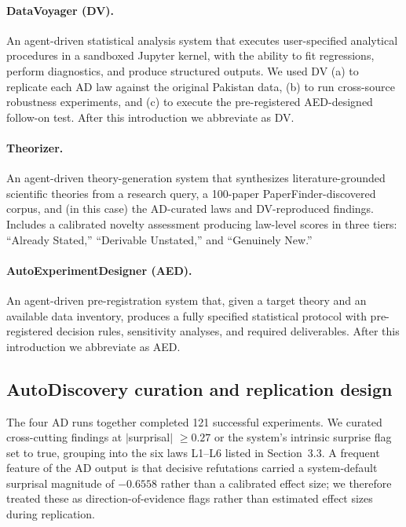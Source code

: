 \documentclass[11pt]{article}
\begin{document}
\paragraph{DataVoyager (DV).} An agent-driven statistical analysis system that executes user-specified analytical procedures in a sandboxed Jupyter kernel, with the ability to fit regressions, perform diagnostics, and produce structured outputs. We used DV (a) to replicate each AD law against the original Pakistan data, (b) to run cross-source robustness experiments, and (c) to execute the pre-registered AED-designed follow-on test. After this introduction we abbreviate as DV.

\paragraph{Theorizer.} An agent-driven theory-generation system that synthesizes literature-grounded scientific theories from a research query, a 100-paper PaperFinder-discovered corpus, and (in this case) the AD-curated laws and DV-reproduced findings. Includes a calibrated novelty assessment producing law-level scores in three tiers: ``Already Stated,'' ``Derivable Unstated,'' and ``Genuinely New.''

\paragraph{AutoExperimentDesigner (AED).} An agent-driven pre-registration system that, given a target theory and an available data inventory, produces a fully specified statistical protocol with pre-registered decision rules, sensitivity analyses, and required deliverables. After this introduction we abbreviate as AED.

\subsection{AutoDiscovery curation and replication design}
\label{sec:methods_ad}

The four AD runs together completed 121 successful experiments. We curated cross-cutting findings at $|$surprisal$|$ $\geq 0.27$ or the system's intrinsic surprise flag set to true, grouping into the six laws L1--L6 listed in Section~3.3. A frequent feature of the AD output is that decisive refutations carried a system-default surprisal magnitude of $-0.6558$ rather than a calibrated effect size; we therefore treated these as direction-of-evidence flags rather than estimated effect sizes during replication.
\end{document}

